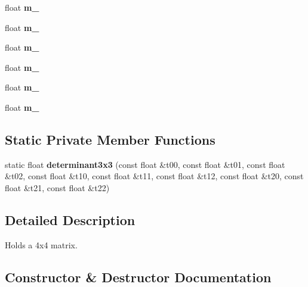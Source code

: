 \begin{DoxyCompactItemize}
float {\bfseries m\+\_}
\item 
\mbox{\label{classflounder_1_1matrix4x4_afa9218cd306b997bf42e89bd0ad7fe35}} 
float {\bfseries m\+\_}
\item 
\mbox{\label{classflounder_1_1matrix4x4_aa19ef702edec1150f375d62c2cc84d43}} 
float {\bfseries m\+\_}
\item 
\mbox{\label{classflounder_1_1matrix4x4_aa8cf2971accfa76a92440cbc96853120}} 
float {\bfseries m\+\_}
\item 
\mbox{\label{classflounder_1_1matrix4x4_aa872665c89aa7d5c144b956cb7aba1ed}} 
float {\bfseries m\+\_}
\item 
\mbox{\label{classflounder_1_1matrix4x4_a6fa74d3a25f38500026d652bce6e7168}} 
float {\bfseries m\+\_}
\end{DoxyCompactItemize}
\subsection*{Static Private Member Functions}
\begin{DoxyCompactItemize}
\item 
\mbox{\label{classflounder_1_1matrix4x4_a6c31f26011f881fda58a3a5c7c542444}} 
static float {\bfseries determinant3x3} (const float \&t00, const float \&t01, const float \&t02, const float \&t10, const float \&t11, const float \&t12, const float \&t20, const float \&t21, const float \&t22)
\end{DoxyCompactItemize}


\subsection{Detailed Description}
Holds a 4x4 matrix. 



\subsection{Constructor \& Destructor Documentation}
\mbox{\label{classflounder_1_1matrix4x4_a3d55e162ebc4f490eeee25e0a63de4c4}} 
